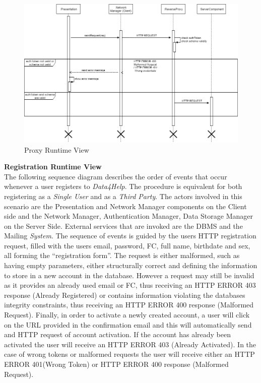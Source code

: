 \documentclass[titlepage]{article}
\begin{document}
	\begin{figure}[H]
		\center
		\includegraphics[width=13cm]{Proxy.png}
		\caption{Proxy Runtime View}
		\label{fig:PROXY}
	\end{figure}
	\noindent
	{\bf Registration Runtime View }\\ 
	The following sequence diagram describes the order of events that occur whenever a user registers to {\it Data4Help}. The procedure is equivalent for both registering as a {\it Single User} and as a {\it Third Party}. The actors involved in this scenario are the Presentation and Network Manager components on the Client side and the Network Manager, Authentication Manager, Data Storage Manager on the Server Side. External services that are invoked are the DBMS and the Mailing {\it System}.
	The sequence of events is guided by the user\textsc{}s HTTP registration request, filled with the user\textsc{}s email, password, FC, full name, birthdate and sex, all forming the “registration form”. The request is either malformed, such as having empty parameters, either structurally correct and defining the information to store in a new account in the database. However a request may still be invalid as it provides an already used email or FC, thus receiving an HTTP ERROR 403 response (Already Registered) or contains information violating the databases integrity constraints, thus receiving an HTTP ERROR 400 response (Malformed Request).
	Finally, in order to activate a newly created account, a user will click on the URL provided in the confirmation email and this will automatically send and HTTP request of account activation. If the account has already been activated the user will receive an HTTP ERROR 403 (Already Activated). In the case of wrong tokens or malformed requests the user will receive either an HTTP ERROR 401(Wrong Token) or HTTP ERROR 400 response (Malformed Request).
	
\end{document}
